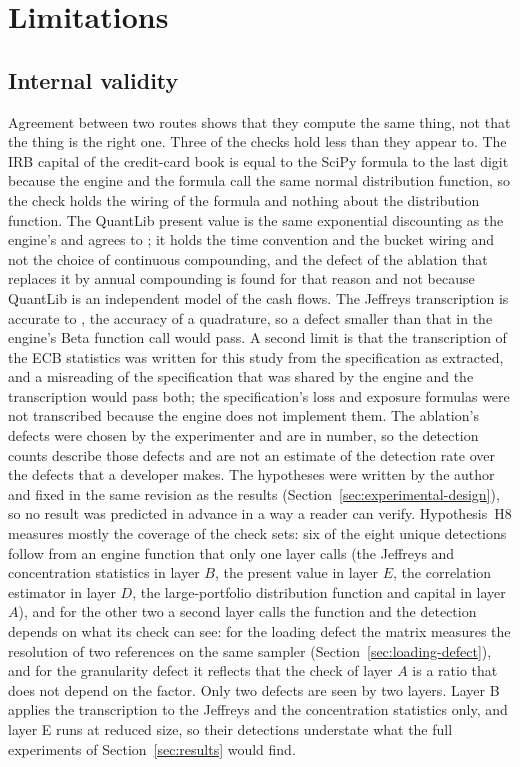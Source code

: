 \section{Limitations}
\label{sec:limitations}

\subsection{Internal validity}

Agreement between two routes shows that they compute the same thing, not that the thing is the right one. Three of the checks hold less than they appear to. The IRB capital of the credit-card book is equal to the SciPy formula to the last digit because the engine and the formula call the same normal distribution function, so the check holds the wiring of the formula and nothing about the distribution function. The QuantLib present value is the same exponential discounting as the engine's and agrees to \irrQlMax{}; it holds the time convention and the bucket wiring and not the choice of continuous compounding, and the defect of the ablation that replaces it by annual compounding is found for that reason and not because QuantLib is an independent model of the cash flows. The Jeffreys transcription is accurate to \ecbJeffMax{}, the accuracy of a quadrature, so a defect smaller than that in the engine's Beta function call would pass. A second limit is that the transcription of the ECB statistics was written for this study from the specification as extracted, and a misreading of the specification that was shared by the engine and the transcription would pass both; the specification's loss and exposure formulas were not transcribed because the engine does not implement them. The ablation's defects were chosen by the experimenter and are \ablMutants{} in number, so the detection counts describe those defects and are not an estimate of the detection rate over the defects that a developer makes. The hypotheses were written by the author and fixed in the same revision as the results (Section~\ref{sec:experimental-design}), so no result was predicted in advance in a way a reader can verify. Hypothesis~H8 measures mostly the coverage of the check sets: six of the eight unique detections follow from an engine function that only one layer calls (the Jeffreys and concentration statistics in layer $B$, the present value in layer $E$, the correlation estimator in layer $D$, the large-portfolio distribution function and capital in layer $A$), and for the other two a second layer calls the function and the detection depends on what its check can see: for the loading defect the matrix measures the resolution of two references on the same sampler (Section~\ref{sec:loading-defect}), and for the granularity defect it reflects that the check of layer $A$ is a ratio that does not depend on the factor. Only two defects are seen by two layers. Layer B applies the transcription to the Jeffreys and the concentration statistics only, and layer E runs at reduced size, so their detections understate what the full experiments of Section~\ref{sec:results} would find.

